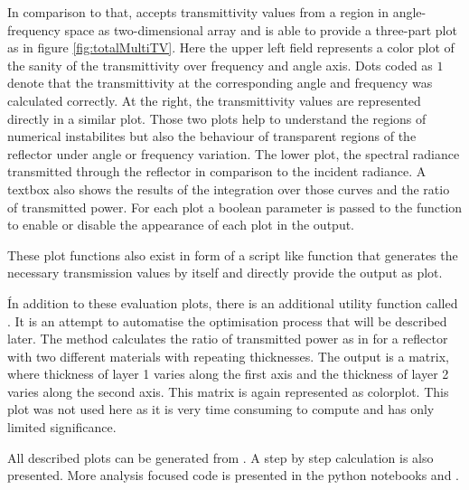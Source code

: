 In comparison to that,  accepts transmittivity values from
a region in angle-frequency space as two-dimensional array and is able to
provide a three-part plot as in figure \ref{fig:totalMultiTV}. Here the
upper left field represents a color plot of the sanity of the transmittivity
over frequency and angle axis. Dots coded as $1$ denote that the transmittivity
at the corresponding angle and frequency was calculated correctly. At the
right, the transmittivity values are represented directly in a similar plot.
Those two plots help to understand the regions of numerical instabilites but
also the behaviour of transparent regions of the reflector under angle or
frequency variation. The lower plot, the spectral radiance transmitted through
the reflector in comparison to the incident radiance. A textbox also shows the
results of the integration over those curves and the ratio of transmitted
power.
For each plot a boolean parameter is passed to the function to enable or
disable the appearance of each plot in the output.

These plot functions also exist in form of a script like function that
generates the necessary transmission values by itself and directly provide the
output as plot.

Ín addition to these evaluation plots, there is an additional utility function
called
. It is an attempt to automatise the
optimisation process that will be described later. The method calculates the
ratio of transmitted power as in  for a reflector with
two different materials with repeating thicknesses. The output is a matrix,
where thickness of layer 1 varies along the first axis and the thickness of
layer 2 varies along the second axis. This matrix is again represented as
colorplot. This plot was not used here as it is very time consuming to compute
and has only limited significance.

All described plots can be generated from . A step by
step calculation is also presented. More analysis focused code is presented in
the python notebooks  and .
